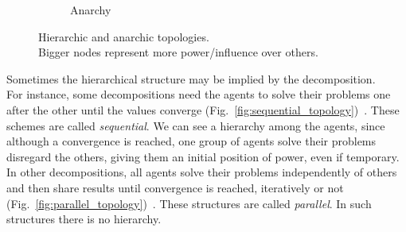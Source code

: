 \documentclass[../main.tex]{subfiles}
\begin{document}
\begin{figure}[H]
\begin{subfigure}[b]{.45\textwidth}
{
  }
  \caption{Anarchy}\label{fig:anarchy_topology}
\end{subfigure}
\caption{Hierarchic and anarchic topologies. \\Bigger nodes represent more power/influence over others.}\label{fig:hierarchic_anarchic}
\end{figure}


Sometimes the hierarchical structure may be implied by the decomposition.
\\For instance, some decompositions need the agents to solve their problems one after the other until the values converge (Fig.~\ref{fig:sequential_topology})~\cite{LiuEtAl2009a}.
These schemes are called \emph{sequential}.
We can see a hierarchy among the agents, since although a convergence is reached, one group of agents solve their problems disregard the others, giving them an initial position of power, even if temporary.
\\In other decompositions, all agents solve their problems independently of others and then share results until convergence is reached, iteratively or not (Fig.~\ref{fig:parallel_topology})~\cite{LiuEtAl2010}.
These structures are called \emph{parallel}.
In such structures there is no hierarchy.
\end{document}
